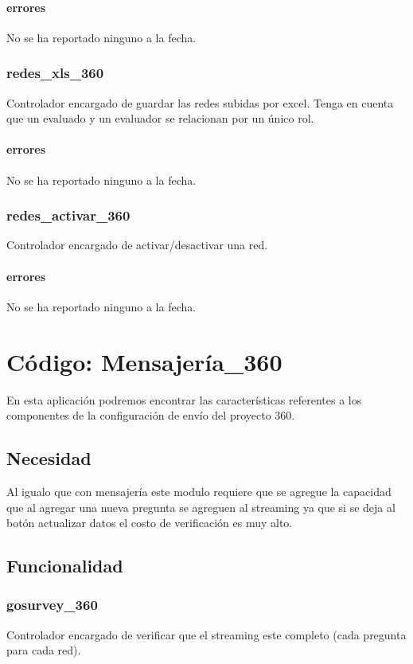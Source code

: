 \documentclass[10pt,a4paper]{book}
\begin{document}
	\subsubsection{errores}
	No se ha reportado ninguno a la fecha.

	\subsection{redes\_xls\_360}
	Controlador encargado de guardar las redes subidas por excel. Tenga en cuenta que un evaluado y un evaluador se relacionan por un único rol.
	\subsubsection{errores}
	No se ha reportado ninguno a la fecha.

	\subsection{redes\_activar\_360}
	Controlador encargado de activar/desactivar una red.
	\subsubsection{errores}
	No se ha reportado ninguno a la fecha.


	\chapter{Código: Mensajería\_360}

	En esta aplicación podremos encontrar las características referentes a los componentes de la configuración de envío del proyecto 360.

	\section{Necesidad}
	Al igualo que con mensajería este modulo requiere que se agregue la capacidad que al agregar una nueva pregunta se agreguen al streaming ya que si se deja al botón actualizar datos el costo de verificación es muy alto.

	\section{Funcionalidad}


	\subsection{gosurvey\_360}
	Controlador encargado de verificar que el streaming este completo (cada pregunta para cada red).
\end{document}
